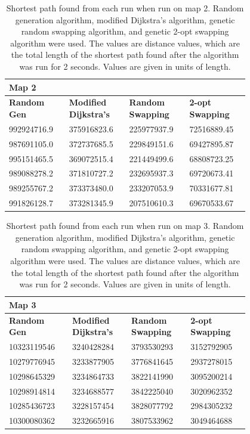 \documentclass{article}
\begin{document}
\begin{appendices}
\begin{table}[H]
    \caption{Shortest path found from each run when run on map 2. Random generation algorithm, modified Dijkstra's algorithm, genetic random swapping algorithm, and genetic 2-opt swapping algorithm were used. The values are distance values, which are the total length of the shortest path found after the algorithm was run for 2 seconds. Values are given in units of length.}
    \centering
    \begin{tabular}{|p{0.2\linewidth}|p{0.2\linewidth}|p{0.2\linewidth}|p{0.2\linewidth}|}
    \hline
        \textbf{Map 2} & ~ & ~ & ~ \\ \hline
        \textbf{Random Gen} & \textbf{Modified Dijkstra's} & \textbf{Random Swapping} & \textbf{2-opt Swapping} \\ \hline
        992924716.9 & 375916823.6 & 225977937.9 & 72516889.45 \\ \hline
        987691105.0 & 372737685.5 & 229849151.6 & 69427895.87 \\ \hline
        995151465.5 & 369072515.4 & 221449499.6 & 68808723.25 \\ \hline
        989088278.2 & 371810727.2 & 232695937.3 & 69720673.41 \\ \hline
        989255767.2 & 373373480.0 & 233207053.9 & 70331677.81 \\ \hline
        991826128.7 & 373281345.9 & 207510610.3 & 69670533.67 \\ \hline
    \end{tabular}
\end{table}

\begin{table}[H]
    \caption{Shortest path found from each run when run on map 3. Random generation algorithm, modified Dijkstra's algorithm, genetic random swapping algorithm, and genetic 2-opt swapping algorithm were used. The values are distance values, which are the total length of the shortest path found after the algorithm was run for 2 seconds. Values are given in units of length.}
    \centering
    \begin{tabular}{|p{0.2\linewidth}|p{0.2\linewidth}|p{0.2\linewidth}|p{0.2\linewidth}|}
    \hline
        \textbf{Map 3} & ~ & ~ & ~ \\ \hline
        \textbf{Random Gen} & \textbf{Modified Dijkstra's} & \textbf{Random Swapping} & \textbf{2-opt Swapping} \\ \hline
        10323119546 & 3240428284 & 3793530293 & 3152792905 \\ \hline
        10279776945 & 3233877905 & 3776841645 & 2937278015 \\ \hline
        10298645329 & 3234864733 & 3822141990 & 3095200214 \\ \hline
        10298914814 & 3234688577 & 3842225040 & 3020962352 \\ \hline
        10285436723 & 3228157454 & 3828077792 & 2984305232 \\ \hline
        10300080362 & 3232665916 & 3807533962 & 3049464688 \\ \hline
    \end{tabular}
\end{table}


\end{appendices}
\end{document}

